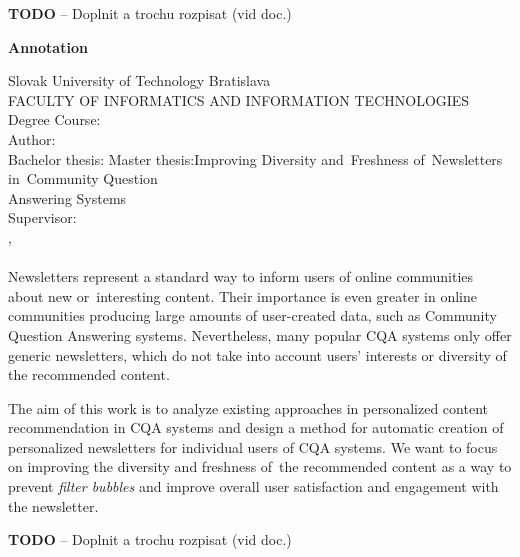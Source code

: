 \textbf{TODO} -- Doplnit a trochu rozpisat (vid doc.)

\afterpage{\blankpage}
\newpage
\thispagestyle{plain}
\begin{center}
\begin{Large}
\textbf{Annotation} \\
\end{Large}
\end{center}
Slovak University of Technology Bratislava
\vspace*{2mm}\\FACULTY OF INFORMATICS AND INFORMATION TECHNOLOGIES
\vspace*{2mm}\\
\noindent
Degree Course:~\ProgramEN
\vspace*{2mm}\\
\noindent
Author:\hspace*{14.5mm}\AuthorEN
\vspace*{2mm}\\
{
	{Bachelor thesis: }\TitleEN
}
{
	{Master thesis:\hspace*{4mm}}Improving Diversity and~Freshness of~Newsletters in~Community Question\\
    \hspace*{27.5mm}Answering Systems
}
\vspace*{2mm}\\
Supervisor: \hspace*{7mm}\SupervisorEN
\vspace*{2mm}\\\Year, \MonthEN\\
\noindent
\\
Newsletters represent a standard way to inform users of online communities about new or~interesting content.
Their importance is even greater in online communities producing large amounts of user-created data, such as
Community Question Answering systems.
Nevertheless, many popular CQA systems only offer generic newsletters, which do not take into account users’ interests
or diversity of the recommended content.

The aim of this work is to analyze existing approaches in personalized content recommendation in CQA systems and design a method for automatic
creation of personalized newsletters for individual users of CQA systems. We want to focus on improving the diversity and freshness of~the
recommended content as a way to prevent \emph{filter bubbles} and improve overall user satisfaction and engagement with the newsletter.

\textbf{TODO} -- Doplnit a trochu rozpisat (vid doc.)

\afterpage{\blankpage}
